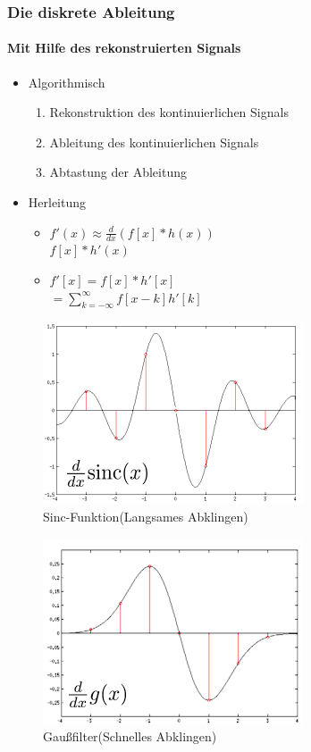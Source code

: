 \documentclass[12pt, a4paper, oneside]{article}
\begin{document}
\subsubsection{Die diskrete Ableitung}
\paragraph*{Mit Hilfe des rekonstruierten Signals}
\begin{itemize}
    \item Algorithmisch
    \begin{enumerate}
        \item Rekonstruktion des kontinuierlichen Signals
        \item Ableitung des kontinuierlichen Signals
        \item Abtastung der Ableitung
    \end{enumerate}
    \item Herleitung
    \begin{itemize}
        \item $f'(x)\approx \frac{d}{dx}(f[x]*h(x))$\\$f[x]*h'(x)$
        \item $f'[x]=f[x]*h'[x]$\\$=\sum\limits _{k=-\infty}^{\infty}f[x-k]h'[k]$
    \end{itemize}
\end{itemize}

\begin{figure}[htbp]
    \centering
    \includegraphics[scale=1]{../img/1-8.png}
    \caption{Sinc-Funktion(Langsames Abklingen)}
    \label{img/1-8}
\end{figure}
\begin{figure}[htbp]
    \centering
    \includegraphics[scale=1]{../img/1-9.png}
    \caption{Gaußfilter(Schnelles Abklingen)}
    \label{img/1-9}
\end{figure}
\end{document}
